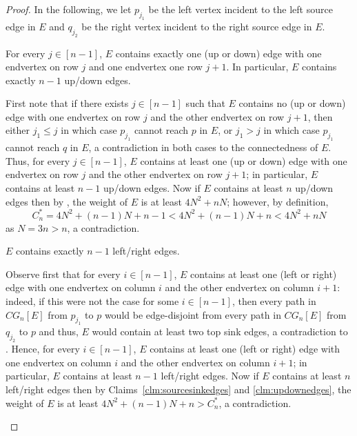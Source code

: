 \begin{proof}
In the following, we let $p_{j_1}$ be the left vertex incident to the left source edge in $E$ and $q_{j_2}$ be the right vertex incident to the right source edge in $E$.

\begin{claim}
\label{clm:updownedges}
For every $j \in [n-1]$, $E$ contains exactly one (up or down) edge with one endvertex on row $j$ and one endvertex one row $j+1$. In particular, $E$ contains exactly $n-1$ up/down edges.
\end{claim}

\begin{claimproof}
First note that if there exists $j \in [n-1]$ such that $E$ contains no (up or down) edge with one endvertex on row $j$ and the other endvertex on row $j+1$, then either $j_1 \leq j$ in which case $p_{j_1}$ cannot reach $p$ in $E$, or $j_1 > j$ in which case $p_{j_1}$ cannot reach $q$ in $E$, a contradiction in both cases to the connectedness of $E$. Thus, for every $j \in [n-1]$, $E$ contains at least one (up or down) edge with one endvertex on row $j$ and the other endvertex on row $j+1$; in particular, $E$ contains at least $n-1$ up/down edges. Now if $E$ contains at least $n$ up/down edges then by , the weight of $E$ is at least $4N^2 + nN$; however, by definition, 
\[
C_n^* = 4N^2 + (n-1)N + n-1 < 4N^2 + (n-1)N + n < 4N^2 + nN
\]
as $N = 3n > n$, a contradiction.
\end{claimproof}

\begin{claim}
\label{clm:leftrightedges}
$E$ contains exactly $n-1$ left/right edges.
\end{claim}

\begin{claimproof}
Observe first that for every $i \in [n-1]$, $E$ contains at least one (left or right) edge with one endvertex on column $i$ and the other endvertex on column $i+1$: indeed, if this were not the case for some $i \in [n-1]$, then every path in $CG_n[E]$ from $p_{j_1}$ to $p$ would be edge-disjoint from every path in $CG_n[E]$ from $q_{j_2}$ to $p$ and thus, $E$ would contain at least two top sink edges, a contradiction to . Hence, for every $i \in [n-1]$, $E$ contains at least one (left or right) edge with one endvertex on column $i$ and the other endvertex on column $i+1$; in particular, $E$ contains at least $n-1$ left/right edges. Now if $E$ contains at least $n$ left/right edges then by Claims~\ref{clm:sourcesinkedges} and \ref{clm:updownedges}, the weight of $E$ is at least $4N^2 + (n-1)N + n > C_n^*$, a contradiction.
\end{claimproof}


\end{proof}
